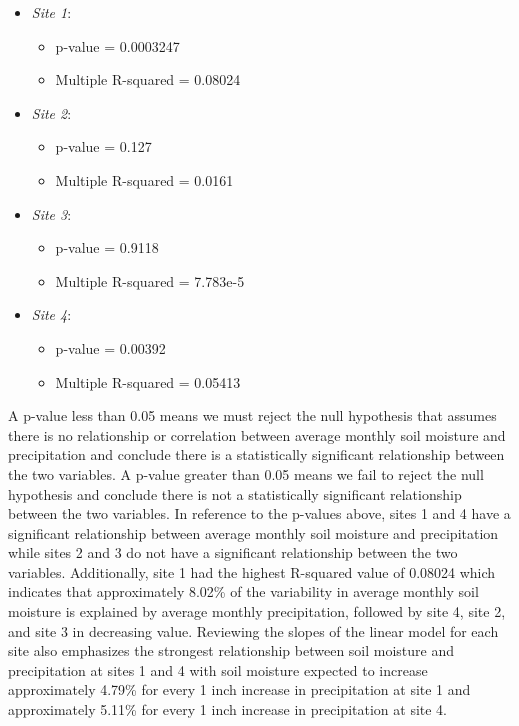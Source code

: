 \documentclass[
  12pt,
]{article}
\providecommand{\tightlist}{%
  \setlength{\itemsep}{0pt}\setlength{\parskip}{0pt}}
\begin{document}
\begin{itemize}
\tightlist
\item
  \emph{Site 1}:

  \begin{itemize}
  \tightlist
  \item
    p-value = 0.0003247
  \item
    Multiple R-squared = 0.08024
  \end{itemize}
\item
  \emph{Site 2}:

  \begin{itemize}
  \tightlist
  \item
    p-value = 0.127
  \item
    Multiple R-squared = 0.0161
  \end{itemize}
\item
  \emph{Site 3}:

  \begin{itemize}
  \tightlist
  \item
    p-value = 0.9118
  \item
    Multiple R-squared = 7.783e-5
  \end{itemize}
\item
  \emph{Site 4}:

  \begin{itemize}
  \tightlist
  \item
    p-value = 0.00392
  \item
    Multiple R-squared = 0.05413
  \end{itemize}
\end{itemize}

A p-value less than 0.05 means we must reject the null hypothesis that
assumes there is no relationship or correlation between average monthly
soil moisture and precipitation and conclude there is a statistically
significant relationship between the two variables. A p-value greater
than 0.05 means we fail to reject the null hypothesis and conclude there
is not a statistically significant relationship between the two
variables. In reference to the p-values above, sites 1 and 4 have a
significant relationship between average monthly soil moisture and
precipitation while sites 2 and 3 do not have a significant relationship
between the two variables. Additionally, site 1 had the highest
R-squared value of 0.08024 which indicates that approximately 8.02\% of
the variability in average monthly soil moisture is explained by average
monthly precipitation, followed by site 4, site 2, and site 3 in
decreasing value. Reviewing the slopes of the linear model for each site
also emphasizes the strongest relationship between soil moisture and
precipitation at sites 1 and 4 with soil moisture expected to increase
approximately 4.79\% for every 1 inch increase in precipitation at site
1 and approximately 5.11\% for every 1 inch increase in precipitation at
site 4.
\end{document}
